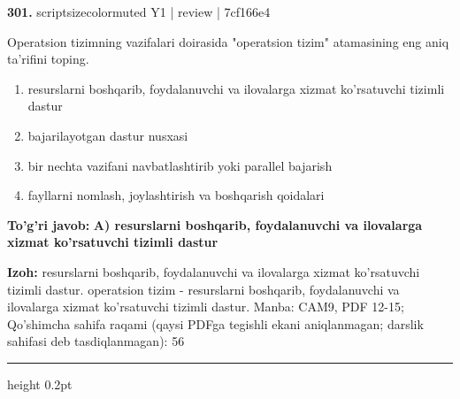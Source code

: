 \documentclass[10pt,a4paper]{article}
\begin{document}
{\bfseries\sffamily\color{ink} 301.} {scriptsizecolor{muted} Y1 | review | 7cf166e4}
\par
Operatsion tizimning vazifalari doirasida "operatsion tizim" atamasining eng aniq ta'rifini toping.
\begin{enumerate}[label=\Alph*),leftmargin=9mm]
\item resurslarni boshqarib, foydalanuvchi va ilovalarga xizmat ko'rsatuvchi tizimli dastur
\item bajarilayotgan dastur nusxasi
\item bir nechta vazifani navbatlashtirib yoki parallel bajarish
\item fayllarni nomlash, joylashtirish va boshqarish qoidalari
\end{enumerate}
\begin{tcolorbox}[enhanced,breakable,colback=teal!4,colframe=teal!60!black,boxrule=0.45pt,arc=1.2mm,left=2.7mm,right=2.7mm,top=1.8mm,bottom=1.8mm,before skip=2mm,after skip=2mm]
{\bfseries\sffamily\color{teal}To'g'ri javob:} \textbf{A) resurslarni boshqarib, foydalanuvchi va ilovalarga xizmat ko'rsatuvchi tizimli dastur}
\par\smallskip
{\bfseries Izoh:} resurslarni boshqarib, foydalanuvchi va ilovalarga xizmat ko'rsatuvchi tizimli dastur. operatsion tizim - resurslarni boshqarib, foydalanuvchi va ilovalarga xizmat ko'rsatuvchi tizimli dastur. Manba: CAM9, PDF 12-15; Qo'shimcha sahifa raqami (qaysi PDFga tegishli ekani aniqlanmagan; darslik sahifasi deb tasdiqlanmagan): 56
\end{tcolorbox}
\vspace{2mm}\hrule height 0.2pt\vspace{3mm}
\end{document}
